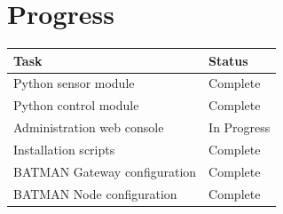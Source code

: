 \documentclass[11pt,a4paper]{article}
\begin{document}
\section{Progress}
\begin{center}
\begin{tabularx}{\textwidth}{ | X | l | }
	\hline
	Task & Status \\
	\hline
	Python sensor module 				& Complete 		\\
	Python control module 				& Complete 		\\
	Administration web console 			& In Progress 	\\
	Installation scripts				& Complete		\\
	BATMAN Gateway configuration		& Complete		\\
	BATMAN Node configuration			& Complete		\\
	\hline
\end{tabularx}
\end{center}
\end{document}
